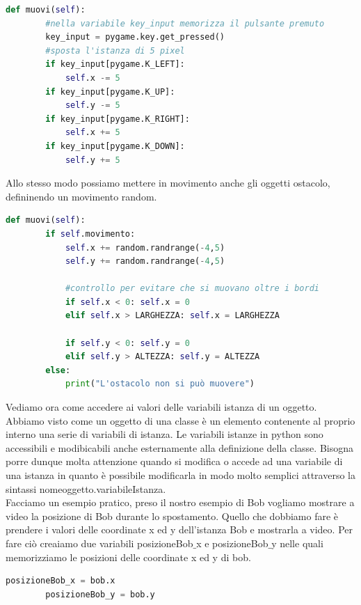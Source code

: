 \documentclass[12pt,a4paper]{article}
\begin{document}
\begin{lstlisting}[language=Python, caption=Metodo istanza muovi() della classe Giocatore]
def muovi(self):
        #nella variabile key_input memorizza il pulsante premuto
        key_input = pygame.key.get_pressed()  
        #sposta l'istanza di 5 pixel
        if key_input[pygame.K_LEFT]:
            self.x -= 5
        if key_input[pygame.K_UP]:
            self.y -= 5
        if key_input[pygame.K_RIGHT]:
            self.x += 5
        if key_input[pygame.K_DOWN]:
            self.y += 5
\end{lstlisting}
Allo stesso modo possiamo mettere in movimento anche gli oggetti ostacolo, defininendo un movimento random.

\begin{lstlisting}[language=Python, caption=Metodo istanza muovi() della classe Ostacolo]
def muovi(self):
        if self.movimento:
            self.x += random.randrange(-4,5)
            self.y += random.randrange(-4,5)

            #controllo per evitare che si muovano oltre i bordi
            if self.x < 0: self.x = 0
            elif self.x > LARGHEZZA: self.x = LARGHEZZA
        
            if self.y < 0: self.y = 0
            elif self.y > ALTEZZA: self.y = ALTEZZA
        else:
            print("L'ostacolo non si può muovere")
\end{lstlisting}

Vediamo ora come accedere ai valori delle variabili istanza di un oggetto. Abbiamo visto come un oggetto di una classe è un elemento contenente al proprio interno una serie di variabili di istanza. Le variabili istanze in python sono accessibili e modibicabili anche esternamente alla definizione della classe. Bisogna porre dunque molta attenzione quando si modifica o accede ad una variabile di una istanza in quanto è possibile modificarla in modo molto semplici attraverso la sintassi nomeoggetto.variabileIstanza. \\
Facciamo un esempio pratico, preso il nostro esempio di Bob vogliamo mostrare a video la posizione di Bob durante lo spostamento. Quello che dobbiamo fare è prendere i valori delle coordinate x ed y dell'istanza Bob e mostrarla a video. Per fare ciò creaiamo due variabili posizioneBob$\_$x e posizioneBob$\_$y nelle quali memorizziamo le posizioni delle coordinate x ed y di bob. 

\begin{lstlisting}[language=Python, caption=Accesso al valore delle variabili istanza]
        posizioneBob_x = bob.x
        posizioneBob_y = bob.y
\end{lstlisting}
\end{document}
